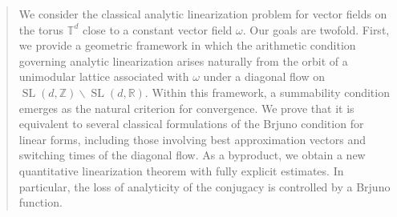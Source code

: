 \documentclass[12pt,reqno,a4paper]{amsart}%
\numberwithin{equation}{section}
\newcommand{\Rr}{{\mathbb{R}}}
\newcommand{\Tt}{{\mathbb{T}}}
\newcommand{\Zz}{{\mathbb{Z}}}
\def\SL{\operatorname{SL}}
\begin{document}
\begin{abstract}

We consider the classical analytic linearization problem for vector fields on the torus $\Tt^d$ close to a constant vector field $\omega$. Our goals are twofold. First, we provide a geometric framework in which the arithmetic condition governing analytic linearization arises naturally from the orbit of a unimodular lattice associated with $\omega$ under a diagonal flow on $\SL(d,\Zz)\backslash \SL(d,\Rr)$. Within this framework, a summability condition emerges
as the natural criterion for convergence. We prove that it is equivalent to several classical formulations of the Brjuno condition for linear forms, including those involving best approximation vectors and switching times of the diagonal flow.
As a byproduct, we obtain a new quantitative linearization theorem with fully explicit estimates. In particular, the loss of analyticity of the conjugacy is controlled by a Brjuno function.

\end{abstract}
\maketitle
\tableofcontents
\end{document}
